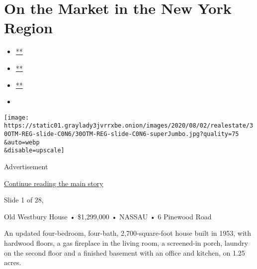 \hypertarget{on-the-market-in-the-new-york-region}{%
\section{On the Market in the New York
Region}\label{on-the-market-in-the-new-york-region}}

\begin{itemize}
\item
  \href{https://www.facebookcorewwwi.onion/sharer.php?app_id=9869919170\&u=https\%3A\%2F\%2Fwww.nytimes3xbfgragh.onion\%2Fslideshow\%2F2020\%2F07\%2F30\%2Frealestate\%2Fon-the-market-in-the-new-york-region.html\%3Fsmid\%3Dfb-share\&name=On\%20the\%20Market\%20in\%20the\%20New\%20York\%20Region\&redirect_uri=https\%3A\%2F\%2Fwww.facebookcorewwwi.onion\%2F}{**}
\item
  \href{https://twitter.com/intent/tweet?url=https\%3A\%2F\%2Fwww.nytimes3xbfgragh.onion\%2Fslideshow\%2F2020\%2F07\%2F30\%2Frealestate\%2Fon-the-market-in-the-new-york-region.html\%3Fsmid\%3Dtw-share\&text=On\%20the\%20Market\%20in\%20the\%20New\%20York\%20Region}{**}
\item
  \href{mailto:?subject=nytimes3xbfgragh.onion\%3A\%20On\%20the\%20Market\%20in\%20the\%20New\%20York\%20Region\&body=From\%20The\%20New\%20York\%20Times\%3A\%0A\%0AOn\%20the\%20Market\%20in\%20the\%20New\%20York\%20Region\%0A\%0AThis\%20week\%E2\%80\%99s\%20properties\%20are\%20four-bedroom\%20homes\%20in\%20Old\%20Westbury\%2C\%20N.Y.\%2C\%20and\%20Crosswicks\%2C\%20N.J.\%0A\%0Ahttps\%3A\%2F\%2Fwww.nytimes3xbfgragh.onion\%2Fslideshow\%2F2020\%2F07\%2F30\%2Frealestate\%2Fon-the-market-in-the-new-york-region.html\%3Fsmid\%3Dem-share}{**}
\item
\end{itemize}

\texttt{[image: https://static01.graylady3jvrrxbe.onion/images/2020/08/02/realestate/30OTM-REG-slide-C0N6/30OTM-REG-slide-C0N6-superJumbo.jpg?quality=75\\\&auto=webp\\\&disable=upscale]}

Advertisement

\protect\hyperlink{after-right-0}{Continue reading the main story}

Slide 1 of 28,

Old Westbury House • \$1,299,000 • NASSAU • 6 Pinewood Road

An updated four-bedroom, four-bath, 2,700-square-foot house built in
1953, with hardwood floors, a gas fireplace in the living room, a
screened-in porch, laundry on the second floor and a finished basement
with an office and kitchen, on 1.25 acres.

